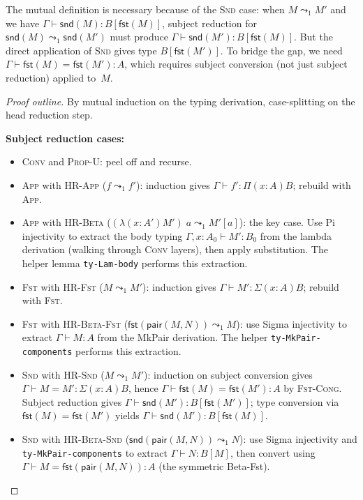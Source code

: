 \documentclass[11pt]{article}
\newcommand{\hastype}[3]{#1 \vdash #2 : #3}
\newcommand{\conveq}[4]{#1 \vdash #2 = #3 : #4}
\newcommand{\Pitype}[2]{\Pi(#1)#2}
\newcommand{\Lamterm}[2]{\lambda(#1)#2}
\newcommand{\App}[2]{#1\;#2}
\newcommand{\substone}[2]{#1[#2]}
\newcommand{\Sigmatype}[2]{\Sigma(#1)#2}
\newcommand{\MkPair}[2]{\mathsf{pair}(#1,#2)}
\newcommand{\Fst}[1]{\mathsf{fst}(#1)}
\newcommand{\Snd}[1]{\mathsf{snd}(#1)}
\begin{document}
\noindent
The mutual definition is necessary because of the \textsc{Snd} case:
when $M \leadsto_1 M'$ and we have $\hastype{\Gamma}{\Snd{M}}{\substone{B}{\Fst{M}}}$,
subject reduction for $\Snd{M} \leadsto_1 \Snd{M'}$ must produce
$\hastype{\Gamma}{\Snd{M'}}{\substone{B}{\Fst{M}}}$.  But
the direct application of \textsc{Snd} gives type $\substone{B}{\Fst{M'}}$.
To bridge the gap, we need $\conveq{\Gamma}{\Fst{M}}{\Fst{M'}}{A}$,
which requires subject conversion (not just subject reduction)
applied to~$M$.

\begin{proof}[Proof outline]
  By mutual induction on the typing derivation, case-splitting on
  the head reduction step.

  \medskip\noindent\textbf{Subject reduction cases:}
  \begin{itemize}
    \item \textsc{Conv} and \textsc{Prop-U}: peel off and recurse.
    \item \textsc{App} with \textsc{HR-App} ($f \leadsto_1 f'$):
      induction gives $\hastype{\Gamma}{f'}{\Pitype{x{:}A}{B}}$;
      rebuild with \textsc{App}.
    \item \textsc{App} with \textsc{HR-Beta}
      ($\App{(\Lamterm{x{:}A'}{M'})}{a} \leadsto_1 \substone{M'}{a}$):
      the key case.  Use Pi injectivity to extract the body typing
      $\hastype{\Gamma, x{:}A_0}{M'}{B_0}$ from the lambda
      derivation (walking through \textsc{Conv} layers), then apply
      substitution.  The helper lemma \texttt{ty-Lam-body} performs
      this extraction.
    \item \textsc{Fst} with \textsc{HR-Fst} ($M \leadsto_1 M'$):
      induction gives $\hastype{\Gamma}{M'}{\Sigmatype{x{:}A}{B}}$;
      rebuild with \textsc{Fst}.
    \item \textsc{Fst} with \textsc{HR-Beta-Fst}
      ($\Fst{\MkPair{M}{N}} \leadsto_1 M$):
      use Sigma injectivity to extract
      $\hastype{\Gamma}{M}{A}$ from the MkPair derivation.
      The helper \texttt{ty-MkPair-components} performs this
      extraction.
    \item \textsc{Snd} with \textsc{HR-Snd} ($M \leadsto_1 M'$):
      induction on subject conversion gives
      $\conveq{\Gamma}{M}{M'}{{\Sigmatype{x{:}A}{B}}}$, hence
      $\conveq{\Gamma}{\Fst{M}}{\Fst{M'}}{A}$ by \textsc{Fst-Cong}.
      Subject reduction gives
      $\hastype{\Gamma}{\Snd{M'}}{\substone{B}{\Fst{M'}}}$;
      type conversion via $\Fst{M} = \Fst{M'}$ yields
      $\hastype{\Gamma}{\Snd{M'}}{\substone{B}{\Fst{M}}}$.
    \item \textsc{Snd} with \textsc{HR-Beta-Snd}
      ($\Snd{\MkPair{M}{N}} \leadsto_1 N$):
      use Sigma injectivity and \texttt{ty-MkPair-components}
      to extract $\hastype{\Gamma}{N}{\substone{B}{M}}$, then
      convert using $\conveq{\Gamma}{M}{\Fst{\MkPair{M}{N}}}{A}$
      (the symmetric Beta-Fst).
  \end{itemize}


\end{proof}
\end{document}
